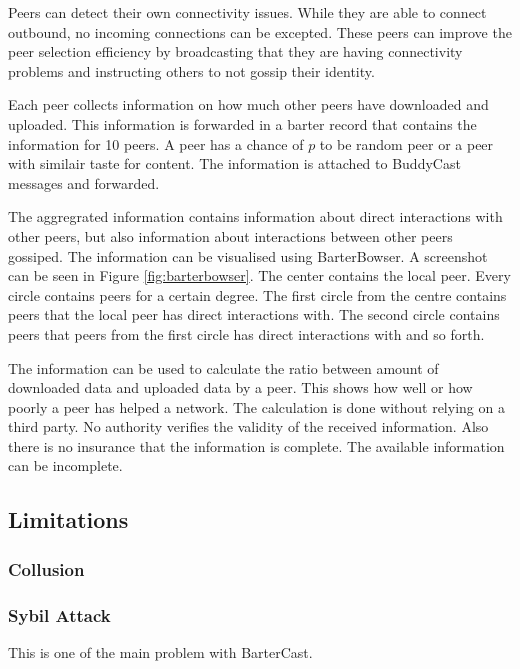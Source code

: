 Peers can detect their own connectivity issues.
While they are able to connect outbound,
no incoming connections can be excepted.
These peers can improve the peer selection efficiency
by broadcasting that they are having connectivity problems
and instructing others to not gossip their identity.

Each peer collects information on how much other peers have downloaded and uploaded.
This information is forwarded in a barter record that contains the information for 10 peers.
A peer has a chance of $p$ to be random peer or a peer with similair taste for content.
The information is attached to BuddyCast messages and forwarded.

The aggregrated information contains information about direct interactions with other peers,
but also information about interactions between other peers gossiped.
The information can be visualised using BarterBowser.
A screenshot can be seen in Figure \ref{fig:barterbowser}.
The center contains the local peer.
Every circle contains peers for a certain degree.
The first circle from the centre contains peers that the local peer has direct interactions with.
The second circle contains peers that peers from the first circle has direct interactions with and so forth.

The information can be used to calculate the ratio between amount of downloaded data and uploaded data by a peer.
This shows how well or how poorly a peer has helped a network.
The calculation is done without relying on a third party.
No authority verifies the validity of the received information.
Also there is no insurance that the information is complete.
The available information can be incomplete.

\subsection{Limitations}

\subsubsection{Collusion}

\subsubsection{Sybil Attack}


This is one of the main problem with BarterCast.




